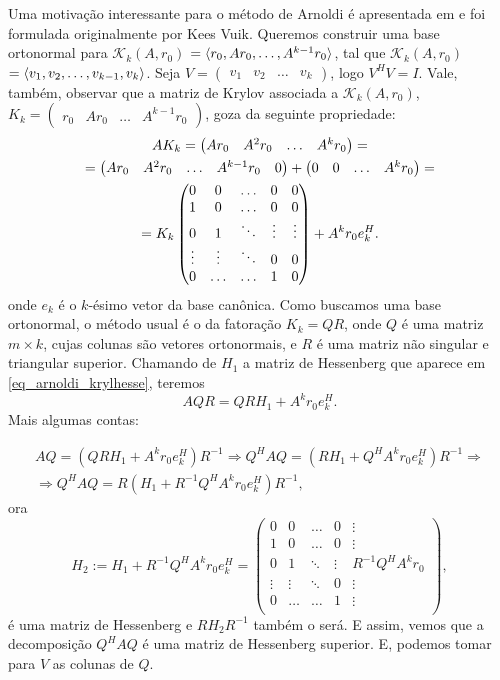 Uma motivação interessante para o método de Arnoldi é apresentada em \cite[pág. 337]{Meurant1999Computer} e foi formulada originalmente por Kees Vuik. Queremos construir uma base ortonormal para $\mathcal{K}_k(A,r_0)$ $={\langle r_0,Ar_0,\ldots,A^{k-1}r_0\rangle}$, tal que $\mathcal{K}_k(A,r_0)$ $={\langle v_1,v_2,\ldots,v_{k-1},v_k\rangle}$. Seja $V=\begin{pmatrix}v_1&v_2&\ldots &v_k\end{pmatrix}$, logo $V^HV=I$. Vale, também, observar que a matriz de Krylov  associada a $\mathcal{K}_k(A,r_0)$, ${K}_k=\begin{pmatrix} r_0&Ar_0&\ldots&A^{k-1}r_0\end{pmatrix}$, goza da seguinte propriedade:
\begin{gather}
A{K}_k=\begin{pmatrix} Ar_0&A^2r_0&\ldots&A^kr_0\end{pmatrix}=\notag\\
=\begin{pmatrix} Ar_0&A^2r_0&\ldots&A^{k-1}r_0&0\end{pmatrix} +\begin{pmatrix} 0&0&\ldots&A^kr_0\end{pmatrix}=\notag\\
={K}_k\begin{pmatrix}
0 & 0 & \ldots & 0 & 0 \\
1 & 0 & \ldots & 0 & 0  \\
0 & 1& \ddots & \vdots & \vdots\\
\vdots & \vdots & \ddots & 0 & 0\\
0 & \ldots & \ldots & 1 & 0 \\
\end{pmatrix}+A^kr_0e_k^H. \label{eq_arnoldi_krylhesse}
\end{gather}
onde $e_k$ é o $k$-ésimo vetor da base canônica. Como buscamos uma base ortonormal, o método usual é o da fatoração ${K}_k=QR$, onde $Q$ é uma matriz $m\times k$, cujas colunas são vetores ortonormais, e $R$ é uma matriz não singular e triangular superior. Chamando de $H_1$ a matriz de Hessenberg que aparece em \eqref{eq_arnoldi_krylhesse}, teremos
\[AQR=QRH_1+A^kr_0e_k^H.\]
Mais algumas contas:

\begin{multline*}
AQ=(QRH_1+A^kr_0e_k^H)R^{-1}\Rightarrow Q^HAQ=(RH_1+Q^HA^kr_0e_k^H)R^{-1}\Rightarrow\\
\Rightarrow Q^HAQ=R(H_1+R^{-1}Q^HA^kr_0e_k^H)R^{-1},
\end{multline*}
ora
\[H_2:=H_1+R^{-1}Q^HA^kr_0e_k^H=\begin{pmatrix}
    0 & 0 & \ldots & 0 & \vdots \\
     1 & 0 & \ldots & 0 & \vdots  \\
     0 & 1& \ddots & \vdots & R^{-1}Q^HA^kr_0 \\
     \vdots & \vdots & \ddots & 0 & \vdots\\
     0 & \ldots & \ldots & 1 & \vdots \\
     \end{pmatrix},\]
     é uma matriz de Hessenberg e $RH_2R^{-1}$ também o será. E assim, vemos que a decomposição $Q^HAQ$ é uma matriz de Hessenberg superior. E, podemos tomar para $V$ as colunas de $Q$.

